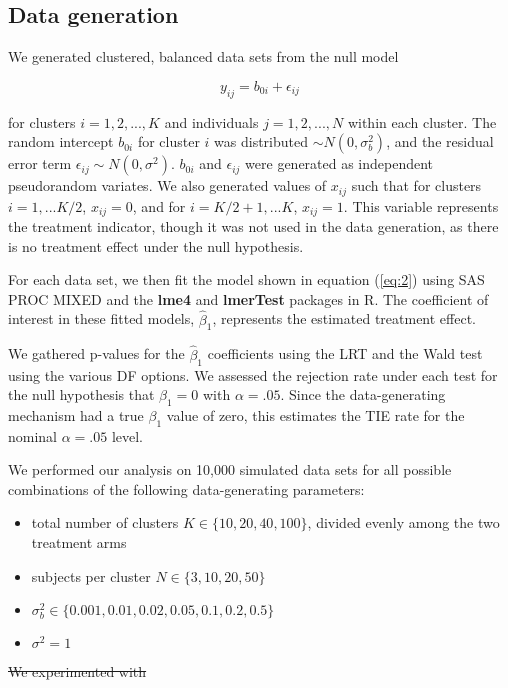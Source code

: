 \documentclass[twocolumn]{bmcart}%
\providecommand{\DIFdeltex}[1]{{\protect\color{red}\sout{#1}}}                      %
\providecommand{\DIFaddbegin}{} %
\providecommand{\DIFdelbegin}{} %
\providecommand{\DIFdelend}{} %
\providecommand{\DIFdel}[1]{\texorpdfstring{\DIFdeltex{#1}}{}} %
\begin{document}
\subsection*{Data generation}

We generated clustered, balanced data sets from the null model

\begin{equation}
  \label{eq:3}
    y_{ij} = b_{0i} + \epsilon_{ij} 
\end{equation}


for clusters $i = 1, 2, ..., K$ and individuals $j = 1, 2, ..., N$ within each cluster. The random intercept $b_{0i}$ for cluster $i$ was distributed $\sim N(0, \sigma_b^2)$, and the residual error term $\epsilon_{ij} \sim N(0, \sigma^2)$.  $b_{0i}$ and $\epsilon_{ij}$ were generated as independent pseudorandom variates. We also generated values of $x_{ij}$ such that for clusters $i = 1, ... K/2$,  $x_{ij}=0$, and for $i = K/2 +1, ... K$, $x_{ij}=1$.  This variable represents the treatment indicator, though it was not used in the data generation, as there is no treatment effect under the null hypothesis.

For each data set, we then fit the model shown in equation (\ref{eq:2}) using SAS PROC MIXED and the \textbf{lme4} and \textbf{lmerTest} packages in R. The coefficient of interest in these fitted models, $\hat{\beta}_1$, represents the estimated treatment effect.

We gathered p-values for the $\hat{\beta}_1$ coefficients using the LRT and the Wald test using the various DF options.  We assessed the rejection rate under each test for the null hypothesis that $\beta_1=0$ with $\alpha=.05$.  Since the data-generating mechanism had a true $\beta_1$ value of zero, this estimates the TIE rate for the nominal $\alpha = .05$ level.

We performed our analysis on 10,000 simulated data sets for all possible combinations of the following data-generating parameters:
\begin{itemize}
 \item total number of clusters $K\in \{10, 20, 40, 100\}$, divided evenly among the two treatment arms

 \item subjects per cluster $N \in \{3, 10, 20, 50\}$

 \item $\sigma_b^2 \in \{0.001, 0.01, 0.02, 0.05, 0.1, 0.2, 0.5\}$

 \item $\sigma^2 = 1$
\end{itemize}
\DIFdelbegin \DIFdel{We experimented with }\DIFdelend \DIFaddbegin 
\end{document}

